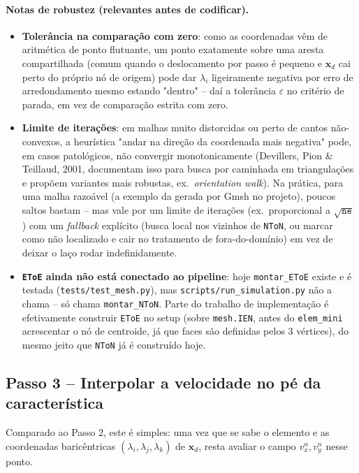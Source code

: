 \documentclass[11pt,a4paper]{article}
\newcommand{\vx}{v_x}
\newcommand{\vy}{v_y}
\begin{document}
\paragraph{Notas de robustez (relevantes antes de codificar).}
\begin{itemize}
  \item \textbf{Tolerância na comparação com zero}: como as
    coordenadas vêm de aritmética de ponto flutuante, um ponto
    exatamente sobre uma aresta compartilhada (comum quando o
    deslocamento por passo é pequeno e $\mathbf{x}_d$ cai perto do
    próprio nó de origem) pode dar $\lambda_i$ ligeiramente negativa
    por erro de arredondamento mesmo estando "dentro" -- daí a
    tolerância $\varepsilon$ no critério de parada, em vez de
    comparação estrita com zero.
  \item \textbf{Limite de iterações}: em malhas muito distorcidas ou
    perto de cantos não-convexos, a heurística "andar na direção da
    coordenada mais negativa" pode, em casos patológicos, não
    convergir monotonicamente (Devillers, Pion \& Teillaud, 2001,
    documentam isso para busca por caminhada em triangulações e
    propõem variantes mais robustas, ex.\ \emph{orientation walk}).
    Na prática, para uma malha razoável (a exemplo da gerada por
    Gmsh no projeto), poucos saltos bastam -- mas vale por um limite
    de iterações (ex.\ proporcional a $\sqrt{\texttt{ne}}$) com um
    \emph{fallback} explícito (busca local nos vizinhos de
    \texttt{NToN}, ou marcar como não localizado e cair no
    tratamento de fora-do-domínio) em vez de deixar o laço rodar
    indefinidamente.
  \item \textbf{\texttt{EToE} ainda não está conectado ao
    pipeline}: hoje \texttt{montar\_EToE} existe e é testada
    (\texttt{tests/test\_mesh.py}), mas \texttt{scripts/run\_simulation.py}
    não a chama -- só chama \texttt{montar\_NToN}. Parte do trabalho
    de implementação é efetivamente construir \texttt{EToE} no setup
    (sobre \texttt{mesh.IEN}, antes do \texttt{elem\_mini} acrescentar
    o nó de centroide, já que faces são definidas pelos 3 vértices),
    do mesmo jeito que \texttt{NToN} já é construído hoje.
\end{itemize}

\subsection{Passo 3 -- Interpolar a velocidade no pé da característica}

Comparado ao Passo 2, este é simples: uma vez que se sabe o elemento
e as coordenadas baricêntricas $(\lambda_i, \lambda_j, \lambda_k)$ de
$\mathbf{x}_d$, resta avaliar o campo $\vx^n, \vy^n$ nesse ponto.
\end{document}
